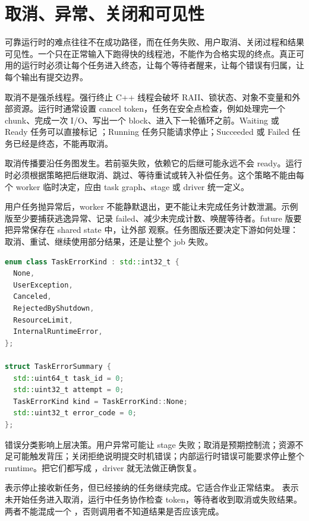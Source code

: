 \section{取消、异常、关闭和可见性}

可靠运行时的难点往往不在成功路径，而在任务失败、用户取消、关闭过程和结果可见性。一个只在正常输入下跑得快的线程池，不能作为合格实现的终点。真正可用的运行时必须让每个任务进入终态，让每个等待者醒来，让每个错误有归属，让每个输出有提交边界。

取消不是强杀线程。强行终止 C++ 线程会破坏 RAII、锁状态、对象不变量和外部资源。运行时通常设置 cancel token，任务在安全点检查，例如处理完一个 chunk、完成一次 I/O、写出一个 block、进入下一轮循环之前。Waiting 或 Ready 任务可以直接标记 ；Running 任务只能请求停止；Succeeded 或 Failed 任务已经是终态，不能再取消。

取消传播要沿任务图发生。若前驱失败，依赖它的后继可能永远不会 ready。运行时必须根据策略把后继取消、跳过、等待重试或转入补偿任务。这个策略不能由每个 worker 临时决定，应由 task graph、stage 或 driver 统一定义。

用户任务抛异常后，worker 不能静默退出，更不能让未完成任务计数泄漏。示例版至少要捕获逃逸异常、记录 failed、减少未完成计数、唤醒等待者。future 版要把异常保存在 shared state 中，让外部  观察。任务图版还要决定下游如何处理：取消、重试、继续使用部分结果，还是让整个 job 失败。

\begin{lstlisting}[language=C++,caption={错误摘要比日志字符串更适合运行时}]
enum class TaskErrorKind : std::int32_t {
  None,
  UserException,
  Canceled,
  RejectedByShutdown,
  ResourceLimit,
  InternalRuntimeError,
};

struct TaskErrorSummary {
  std::uint64_t task_id = 0;
  std::uint32_t attempt = 0;
  TaskErrorKind kind = TaskErrorKind::None;
  std::uint32_t error_code = 0;
};
\end{lstlisting}

错误分类影响上层决策。用户异常可能让 stage 失败；取消是预期控制流；资源不足可能触发背压；关闭拒绝说明提交时机错误；内部运行时错误可能要求停止整个 runtime。把它们都写成 ，driver 就无法做正确恢复。

 表示停止接收新任务，但已经接纳的任务继续完成。它适合作业正常结束。 表示未开始任务进入取消，运行中任务协作检查 token，等待者收到取消或失败结果。两者不能混成一个 ，否则调用者不知道结果是否应该完成。

